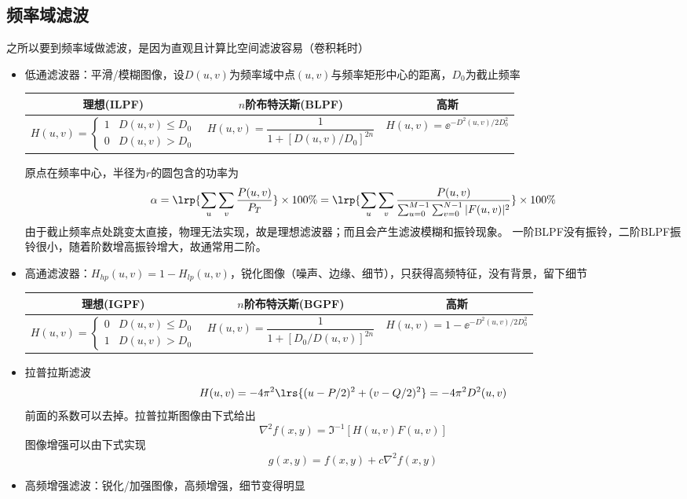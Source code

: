 \subsection{频率域滤波}
之所以要到频率域做滤波，是因为直观且计算比空间滤波容易（卷积耗时）
\begin{itemize}
\item 低通滤波器：平滑/模糊图像，设$D(u,v)$为频率域中点$(u,v)$与频率矩形中心的距离，$D_0$为截止频率
\begin{center}
\begin{tabular}{c|c|c}\hline
理想(ILPF) & $n$阶布特沃斯(BLPF) & 高斯\\\hline
$H(u,v)=\begin{cases}1 & D(u,v)\leq D_0\\0 & D(u,v)>D_0\end{cases}$ &
$H(u,v)=\dfrac{1}{1+[D(u,v)/D_0]^{2n}}$ &
$H(u,v)=\ee^{-D^2(u,v)/2D_0^2}$\\\hline
\end{tabular}
\end{center}
原点在频率中心，半径为$r$的圆包含的功率为
\[\alpha=\lrp{\sum_u\sum_v \frac{P(u,v)}{P_T}}\times 100\%=\lrp{\sum_u\sum_v \frac{P(u,v)}{\sum_{u=0}^{M-1}\sum_{v=0}^{N-1}|F(u,v)|^2}}\times 100\%\]
由于截止频率点处跳变太直接，物理无法实现，故是理想滤波器；而且会产生滤波模糊和振铃现象。
一阶BLPF没有振铃，二阶BLPF振铃很小，随着阶数增高振铃增大，故通常用二阶。
\item 高通滤波器：$H_{hp}(u,v)=1-H_{lp}(u,v)$，锐化图像（噪声、边缘、细节），只获得高频特征，没有背景，留下细节
\begin{center}
\begin{tabular}{c|c|c}\hline
理想(IGPF) & $n$阶布特沃斯(BGPF) & 高斯\\\hline
$H(u,v)=\begin{cases}0 & D(u,v)\leq D_0\\1 & D(u,v)>D_0\end{cases}$ &
$H(u,v)=\dfrac{1}{1+[D_0/D(u,v)]^{2n}}$ &
$H(u,v)=1-\ee^{-D^2(u,v)/2D_0^2}$\\\hline
\end{tabular}
\end{center}
\item 拉普拉斯滤波
\[H(u,v)=-4\pi^2\lrs{(u-P/2)^2+(v-Q/2)^2}=-4\pi^2D^2(u,v)\]
前面的系数可以去掉。拉普拉斯图像由下式给出
\[\nabla^2f(x,y)=\Im^{-1}[H(u,v)F(u,v)]\]
图像增强可以由下式实现
\[g(x,y)=f(x,y)+c\nabla^2 f(x,y)\]
\item 高频增强滤波：锐化/加强图像，高频增强，细节变得明显
\[\begin{aligned}

\end{aligned}\]
\end{itemize}
